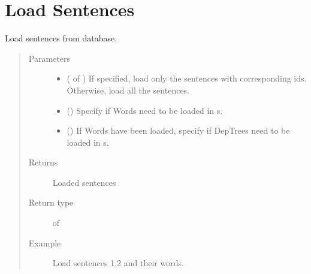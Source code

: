\documentclass[letterpaper,10pt,english]{sphinxmanual}
\begin{document}
\section{Load Sentences}
\label{\detokenize{load:module-loacore.load.sentence_load}}\label{\detokenize{load:load-sentences}}

\begin{fulllineitems}
\label{\detokenize{load:loacore.load.sentence_load.load_sentences}}
Load sentences from database.
\begin{quote}\begin{description}
\item[{Parameters}] \leavevmode\begin{itemize}
\item {} 
 ( of ) \textendash{} If specified, load only the sentences with corresponding ids. Otherwise, load all the sentences.

\item {} 
 () \textendash{} Specify if Words need to be loaded in  s.

\item {} 
 () \textendash{} If Words have been loaded, specify if DepTrees need to be loaded in  s.

\end{itemize}

\item[{Returns}] \leavevmode
Loaded sentences

\item[{Return type}] \leavevmode
{} of 

\item[{Example}] \leavevmode
Load sentences 1,2 and their words.


\end{description}
\end{quote}
\end{fulllineitems}
\end{document}
